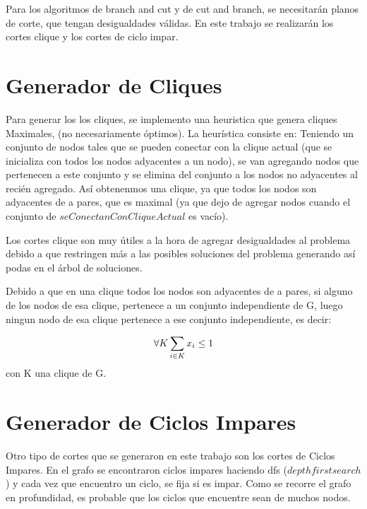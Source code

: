 Para los algoritmos de branch and cut y de cut and branch, se necesitar\'an planos de corte, que tengan desigualdades v\'alidas. En este trabajo se realizar\'an los cortes clique y los cortes de ciclo impar.

\section{Generador de Cliques}

\par{Para generar los los cliques, se implemento una heuristica que genera cliques Maximales,
(no necesariamente \'optimos). La heur\'istica consiste en:
Teniendo un conjunto de nodos tales que se pueden conectar con la clique actual (que se inicializa con todos los nodos adyacentes a un nodo), se van agregando nodos que pertenecen a este conjunto y se elimina del conjunto a los nodos no adyacentes al reci\'en agregado.
As\'i obtenenmos una clique, ya que todos los nodos son adyacentes de a pares, que es maximal (ya que dejo de agregar nodos cuando el conjunto de $seConectanConCliqueActual$ es vac\'io).

Los cortes clique son muy \'utiles a la hora de agregar desigualdades al problema debido a que restringen m\'as a las posibles soluciones del problema generando as\'i podas en el \'arbol de soluciones.

Debido a que en una clique todos los nodos son adyacentes de a pares, si alguno de los nodos de esa clique, 
pertenece a un conjunto independiente de G, luego ningun nodo de esa clique pertenece a ese conjunto independiente, es decir:

\begin{equation*}
    \forall K \sum_{i \in K} x_i \leq 1 \\
\end{equation*}
con K una clique de G.

\section{Generador de Ciclos Impares}

\par{Otro tipo de cortes que se generaron en este trabajo son los cortes de Ciclos Impares.
En el grafo se encontraron ciclos impares haciendo dfs ($depth first search$) y cada vez que encuentro un ciclo, se fija si es impar.
Como se recorre el grafo en profundidad, es probable que los ciclos que encuentre sean de muchos nodos.

}}
